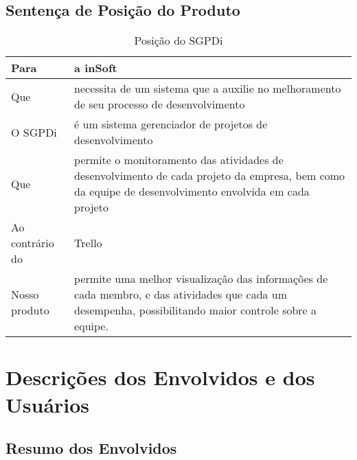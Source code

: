     \subsection{Sentença de Posição do Produto}

      \begin{table}[H]
        \centering
        \begin{tabular}{|>{\columncolor[HTML]{C0C0C0}}p{}|p{}|}
          \hline
          Para            &   a inSoft                                                 \\ \hline
          Que             &   necessita de um sistema que a auxilie no melhoramento de seu processo de desenvolvimento
                                                                                       \\ \hline
          O SGPDi           &   é um sistema gerenciador de projetos de desenvolvimento  \\ \hline
          Que             &   permite o monitoramento das atividades de desenvolvimento de cada projeto da empresa, bem como da equipe de desenvolvimento envolvida em cada projeto                \\ \hline
          Ao contrário do &   Trello                                                   \\ \hline
          Nosso produto   &   permite uma melhor visualização das informações de cada membro, e das atividades que cada um desempenha, possibilitando maior controle sobre a equipe.               \\ \hline
        \end{tabular}
        \caption{Posição do SGPDi}
      \end{table}

  \section{Descrições dos Envolvidos e dos Usuários}
    \subsection{Resumo dos Envolvidos}

